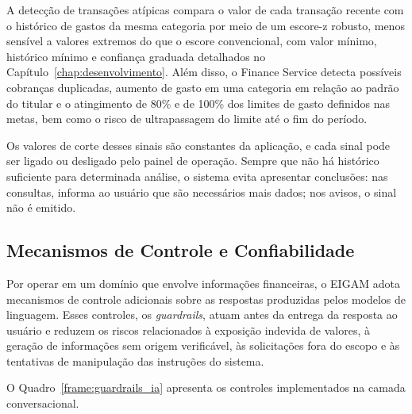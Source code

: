 A detecção de transações atípicas compara o valor de cada transação recente com o histórico de gastos da mesma categoria por meio de um escore-z robusto, menos sensível a valores extremos do que o escore convencional, com valor mínimo, histórico mínimo e confiança graduada detalhados no Capítulo~\ref{chap:desenvolvimento}. Além disso, o Finance Service detecta possíveis cobranças duplicadas, aumento de gasto em uma categoria em relação ao padrão do titular e o atingimento de 80\% e de 100\% dos limites de gasto definidos nas metas, bem como o risco de ultrapassagem do limite até o fim do período.

Os valores de corte desses sinais são constantes da aplicação, e cada sinal pode ser ligado ou desligado pelo painel de operação. Sempre que não há histórico suficiente para determinada análise, o sistema evita apresentar conclusões: nas consultas, informa ao usuário que são necessários mais dados; nos avisos, o sinal não é emitido.

\subsection{Mecanismos de Controle e Confiabilidade}

Por operar em um domínio que envolve informações financeiras, o EIGAM adota mecanismos de controle adicionais sobre as respostas produzidas pelos modelos de linguagem. Esses controles, os \textit{guardrails}, atuam antes da entrega da resposta ao usuário e reduzem os riscos relacionados à exposição indevida de valores, à geração de informações sem origem verificável, às solicitações fora do escopo e às tentativas de manipulação das instruções do sistema.

O Quadro~\ref{frame:guardrails_ia} apresenta os controles implementados na camada conversacional.

